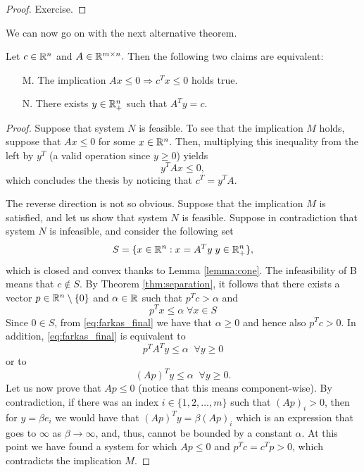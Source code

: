 \documentclass[10pt,a4paper]{article}
\begin{document}
\begin{proof}
	Exercise.
\end{proof}
\noindent We can now go on with the next alternative theorem.
\begin{lemma}\label{lemma:farkas}
	Let $c\in \mathbb{R}^n$ and $A\in \mathbb{R}^{m\times n}.$ Then the following two claims are equivalent:
	\begin{itemize}
		\item[M.] The implication $Ax\leq 0 \Rightarrow c^Tx\leq 0$ holds true. 
		\item[N.] There exists $y\in \mathbb{R}^n_+$ such that $A^Ty=c.$
	\end{itemize}
\end{lemma}
\begin{proof}
	Suppose that system $N$ is feasible. To see that the implication $M$ holds, suppose that $Ax\leq 0$ for some $x\in \mathbb{R}^n$. Then, multiplying this inequality from the left by $y^T$ (a valid operation since $y\geq0$) yields 
	\begin{equation*}
		y^TAx\leq 0,
	\end{equation*}
which concludes the thesis by noticing that $c^T=y^TA$. 
\par The reverse direction is not so obvious. Suppose that the implication $M$ is satisfied, and
let us show that system $N$ is feasible. Suppose in contradiction that system $N$ is infeasible,
and consider the following set
\begin{equation*}
	S=\{x\in\mathbb{R}^n: x= A^Ty \; y\in \mathbb{R}^n_+\},
\end{equation*}
which is closed and convex thanks to Lemma \ref{lemma:cone}. The infeasibility of B means that $c\not \in S$. By Theorem \ref{thm:separation}, it follows that there exists a vector $p\in \mathbb{R}^n \setminus \{0\}$ and $\alpha\in \mathbb{R}$ such that $p^Tc>\alpha$ and 
\begin{equation}\label{eq:farkas_final}
	p^Tx\leq \alpha \; \forall x\in S
\end{equation}
Since $0\in S$, from \eqref{eq:farkas_final} we have that $\alpha\geq 0$ and hence also $p^Tc>0$. In addition, \eqref{eq:farkas_final} is equivalent to 
\begin{equation*}
	p^TA^Ty\leq \alpha \;\; \forall y\geq 0 
\end{equation*}
or to 
\begin{equation*}
	(Ap)^Ty\leq \alpha \;\; \forall y\geq 0.
\end{equation*}
Let us now prove that $Ap \leq 0$ (notice that this means component-wise). By contradiction, if there was an index $i\in \{1,2, \dots,m\}$ such that $(Ap)_i>0$, then for $y=\beta e_i$ we would have that $(Ap)^Ty = \beta (Ap)_i$ which is an expression that goes to $\infty$ as $\beta\to \infty$, and, thus, cannot be bounded by a constant $\alpha$. At this point we have found a system for which $Ap\leq 0$ and $p^Tc=c^Tp>0$, which contradicts the implication $M$.
\end{proof}
\end{document}
